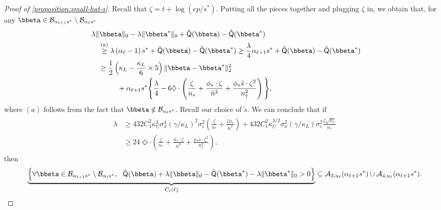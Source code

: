 \documentclass[10pt]{article}
\numberwithin{equation}{section}
\begin{document}
\begin{proof}[Proof of \cref{proposition:small-hat-s}]
Recall that $\zeta = t + \log(ep/s^*)$. 
Putting all the pieces together and plugging $\zeta$ in, we obtain that, for any $\bbeta \in \mathcal{B}_{\alpha_{\ell+1}s^*} \setminus \mathcal{B}_{\alpha_{\ell}s^*}$
\begin{align*}
    & ~\lambda \|\bbeta\|_0 - \lambda \|\bbeta^*\|_0 + \hat{\mathsf{Q}}(\bbeta) - \hat{\mathsf{Q}}(\bbeta^*) \\
    & ~~~~ \overset{(a)}{\ge} \lambda \left(\alpha_{\ell} -  1\right) s^* + \hat{\mathsf{Q}}(\bbeta) - \hat{\mathsf{Q}}(\bbeta^*) \ge  \frac{\lambda}{4} \alpha_{\ell+1} s^* + \hat{\mathsf{Q}}(\bbeta) - \hat{\mathsf{Q}}(\bbeta^*) \\
    & ~~~~ \ge \frac{1}{2}\left(\kappa_L - \frac{\kappa_L}{6} \times 5\right) \|\bbeta - \bbeta^*\|_2^2 \\
    & ~~~~~~~~~~~~ + \alpha_{\ell+1} s^* \Bigg\{\frac{\lambda}{4} - 6\Diamond \cdot \left(\frac{\zeta}{n_*} + \frac{\phi_* \cdot \zeta}{\bar{n}^2} + \frac{\phi_* \tilde{s}\cdot \zeta^2}{n_\dagger^2}\right)\Bigg\},
\end{align*} where $(a)$ follows from the fact that $\bbeta \notin \mathcal{B}_{\alpha_\ell s^*}$. Recall our choice of $\tilde{s}$. We can conclude that if
\begin{align}
\label{eq:proof-lambda-req2}
\begin{split}
    \lambda &\ge 432C_1^2 \kappa_U^{3} \sigma_x^4 (\gamma/\kappa_L)^2 \sigma_{\varepsilon}^2 \left(\frac{\zeta}{n_*} + \frac{\zeta \phi_*}{\bar{n}^2}\right) + 432C_1^2 \kappa_U^{3/2} \sigma_x^2 (\gamma/\kappa_L) \sigma_\varepsilon^2 \frac{\zeta \sqrt{\phi_*}}{n_\dagger} \\
    &\ge 24\Diamond \cdot \left(\frac{\zeta}{n_*} + \frac{\phi_* \cdot \zeta}{\bar{n}^2} + \frac{\phi_* \tilde{s}\cdot \zeta^2}{n_\dagger^2} \right),
\end{split}
\end{align} then 
\begin{align*}
    \underbrace{\left\{\forall \bbeta \in \mathcal{B}_{\alpha_{\ell+1} s^*} \setminus \mathcal{B}_{\alpha_{\ell} s^*}, ~~ \hat{\mathsf{Q}}(\bbeta) + \lambda \|\bbeta\|_0 - \hat{\mathsf{Q}}(\bbeta^*) - \lambda \|\bbeta^*\|_0 > 0\right\}}_{C_t(\ell)} \subseteq \mathcal{A}_{3,u_{\ell}}(\alpha_{\ell+1} s^*) \cup \mathcal{A}_{4,u_{\ell}}(\alpha_{\ell+1} s^*).
\end{align*}


\end{proof}
\end{document}
